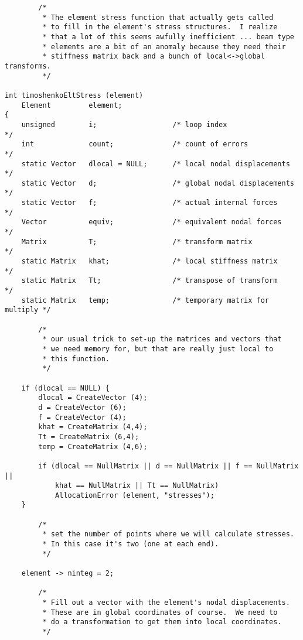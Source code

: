 {\small
\begin{screen}
 \begin{verbatim}
        /*
         * The element stress function that actually gets called
         * to fill in the element's stress structures.  I realize
         * that a lot of this seems awfully inefficient ... beam type
         * elements are a bit of an anomaly because they need their
         * stiffness matrix back and a bunch of local<->global transforms.
         */

int timoshenkoEltStress (element)
    Element         element;
{
    unsigned        i;                  /* loop index                    */
    int             count;              /* count of errors               */
    static Vector   dlocal = NULL;      /* local nodal displacements     */
    static Vector   d;                  /* global nodal displacements    */
    static Vector   f;                  /* actual internal forces        */
    Vector          equiv;              /* equivalent nodal forces       */
    Matrix          T;                  /* transform matrix              */
    static Matrix   khat;               /* local stiffness matrix        */
    static Matrix   Tt;                 /* transpose of transform        */
    static Matrix   temp;               /* temporary matrix for multiply */

        /*
         * our usual trick to set-up the matrices and vectors that
         * we need memory for, but that are really just local to 
         * this function.
         */

    if (dlocal == NULL) {
        dlocal = CreateVector (4);
        d = CreateVector (6);
        f = CreateVector (4);
        khat = CreateMatrix (4,4);
        Tt = CreateMatrix (6,4);
        temp = CreateMatrix (4,6);

        if (dlocal == NullMatrix || d == NullMatrix || f == NullMatrix ||
            khat == NullMatrix || Tt == NullMatrix)
            AllocationError (element, "stresses");
    }
        
        /*
         * set the number of points where we will calculate stresses.
         * In this case it's two (one at each end).
         */

    element -> ninteg = 2;

        /*
         * Fill out a vector with the element's nodal displacements.
         * These are in global coordinates of course.  We need to
         * do a transformation to get them into local coordinates.
         */


\end{verbatim}
\end{screen}}
